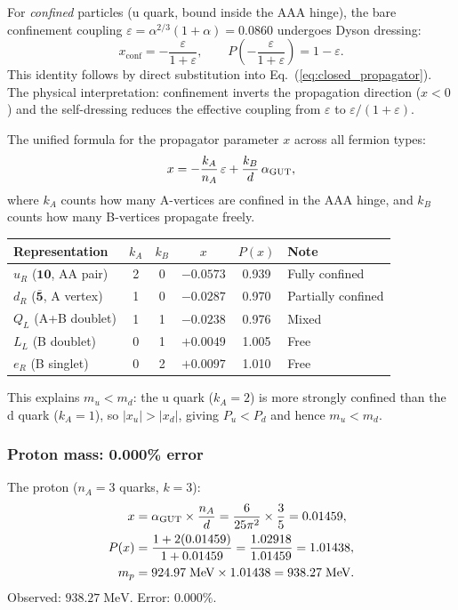 For \emph{confined} particles (u quark, bound inside the AAA hinge), the bare confinement coupling $\varepsilon = \alpha^{2/3}(1+\alpha) = 0.0860$ undergoes Dyson dressing:
\begin{equation}
\label{eq:dyson_dressing}
x_\mathrm{conf} = -\frac{\varepsilon}{1+\varepsilon}, \qquad P\!\left(-\frac{\varepsilon}{1+\varepsilon}\right) = 1 - \varepsilon.
\end{equation}
This identity follows by direct substitution into Eq.~(\ref{eq:closed_propagator}).  The physical interpretation: confinement inverts the propagation direction ($x < 0$) and the self-dressing reduces the effective coupling from $\varepsilon$ to $\varepsilon/(1+\varepsilon)$.

The unified formula for the propagator parameter $x$ across all fermion types:
\begin{equation}
x = -\frac{k_A}{n_A}\,\varepsilon + \frac{k_B}{d}\,\alpha_{\mathrm{GUT}},
\end{equation}
where $k_A$ counts how many A-vertices are confined in the AAA hinge, and $k_B$ counts how many B-vertices propagate freely.

\begin{center}
\begin{tabular}{lccccl}
\hline
Representation & $k_A$ & $k_B$ & $x$ & $P(x)$ & Note \\
\hline
$u_R$ ($\mathbf{10}$, AA pair) & 2 & 0 & $-0.0573$ & 0.939 & Fully confined \\
$d_R$ ($\bar{\mathbf{5}}$, A vertex) & 1 & 0 & $-0.0287$ & 0.970 & Partially confined \\
$Q_L$ (A+B doublet) & 1 & 1 & $-0.0238$ & 0.976 & Mixed \\
$L_L$ (B doublet) & 0 & 1 & $+0.0049$ & 1.005 & Free \\
$e_R$ (B singlet) & 0 & 2 & $+0.0097$ & 1.010 & Free \\
\hline
\end{tabular}
\end{center}

This explains $m_u < m_d$: the u quark ($k_A = 2$) is more strongly confined than the d quark ($k_A = 1$), so $|x_u| > |x_d|$, giving $P_u < P_d$ and hence $m_u < m_d$.

\subsubsection{Proton mass: 0.000\% error}

The proton ($n_A = 3$ quarks, $k = 3$):
\begin{align}
x &= \alpha_{\mathrm{GUT}} \times \frac{n_A}{d} = \frac{6}{25\pi^2} \times \frac{3}{5} = 0.01459, \\
P(x) &= \frac{1 + 2(0.01459)}{1 + 0.01459} = \frac{1.02918}{1.01459} = 1.01438, \\
m_p &= 924.97\;\text{MeV} \times 1.01438 = 938.27\;\text{MeV}.
\end{align}
Observed: $938.27\;\text{MeV}$.  Error: $\mathbf{0.000\%}$.

